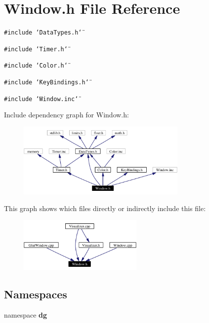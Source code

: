 \section{Window.h File Reference}
\label{Window_8h}
{\tt \#include \char`\"{}Data\-Types.h\char`\"{}}\par
{\tt \#include \char`\"{}Timer.h\char`\"{}}\par
{\tt \#include \char`\"{}Color.h\char`\"{}}\par
{\tt \#include \char`\"{}Key\-Bindings.h\char`\"{}}\par
{\tt \#include \char`\"{}Window.inc\char`\"{}}\par


Include dependency graph for Window.h:\begin{figure}[H]
\begin{center}
\leavevmode
\includegraphics[width=233pt]{Window_8h__incl}
\end{center}
\end{figure}


This graph shows which files directly or indirectly include this file:\begin{figure}[H]
\begin{center}
\leavevmode
\includegraphics[width=171pt]{Window_8h__dep__incl}
\end{center}
\end{figure}
\subsection*{Namespaces}
\begin{CompactItemize}
\item 
namespace {\bf dg}
\end{CompactItemize}

